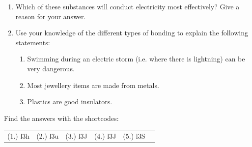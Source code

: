 \begin{enumerate}[noitemsep, label=\textbf{\arabic*}. ]
\begin{table}[H]
\begin{center}
\begin{xtabular}[t]{|l|l|}
        $\mathrm{MgCl}{}_{2}$ &
     \tabularnewline{}
        $\mathrm{Zn}$ &
     \tabularnewline{}
    \end{xtabular}
      \end{center}
    \begin{center}{\small\bfseries Table 5.3}\end{center}
    \begin{caption}{\small\bfseries Table 5.3}\end{caption}
\end{table}
    \par
          \label{m38694*uid92}\item Which of these substances will conduct electricity most effectively? Give a reason for your answer.\newline
\label{m38694*uid93}\item Use your knowledge of the different types of bonding to explain the following statements:
\label{m38694*id143618}\begin{enumerate}[noitemsep, label=\textbf{\alph*}. ] 
            \label{m38694*uid94}\item Swimming during an electric storm (i.e. where there is lightning) can be very dangerous.
\label{m38694*uid95}\item Most jewellery items are made from metals.
\label{m38694*uid96}\item Plastics are good insulators.
\end{enumerate}
                \end{enumerate}
  \label{m38694**end}
\par {} Find the answers with the shortcodes:
 \par \begin{tabular}[h]{cccccc}
 (1.) l3h  &  (2.) l3u  &  (3.) l3J  &  (4.) l3J  &  (5.) l3S  & \end{tabular}
